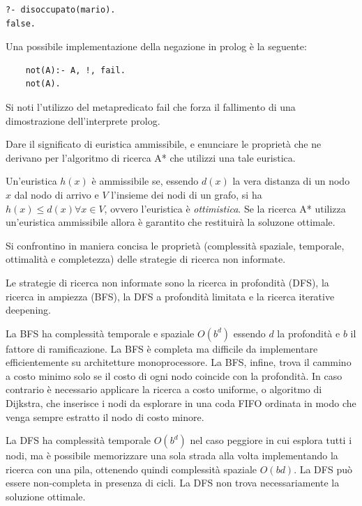 \documentclass[answers, a4paper, 11pt]{exam}
\begin{document}
\begin{questions}
\begin{solution}
\begin{verbatim}
?- disoccupato(mario).
false.

  \end{verbatim}
  Una possibile implementazione della negazione in prolog è la seguente: \newline
  \begin{verbatim}
    not(A):- A, !, fail.
    not(A).
  \end{verbatim}
  Si noti l'utilizzo del metapredicato fail che forza il fallimento di una dimostrazione dell'interprete prolog.
    \end{solution}

\question Dare il significato di euristica ammissibile, e enunciare le proprietà che ne derivano per l’algoritmo
di ricerca A* che utilizzi una tale euristica.
	\begin{solution}
		Un'euristica $h(x)$ è ammissibile se, essendo $d(x)$ la vera distanza di un nodo $x$ dal nodo di arrivo e $V$ l'insieme dei nodi di un grafo, si ha $h(x) \leq d(x) \forall x \in V$, ovvero l'euristica è \emph{ottimistica}. 
		Se la ricerca A* utilizza un'euristica ammissibile allora è garantito che restituirà la soluzone ottimale. 
	\end{solution}
\question Si confrontino in maniera concisa le proprietà (complessità spaziale, temporale, ottimalità e completezza) delle strategie di ricerca non informate.
\begin{solution}
  Le strategie di  ricerca non informate sono la ricerca in profondità (DFS), la ricerca in ampiezza (BFS), la DFS a profondità limitata e la ricerca iterative deepening. 

  La BFS ha complessità temporale e spaziale $O(b^d)$ essendo $d$ la profondità e $b$ il fattore di ramificazione.
  La BFS è completa ma difficile da implementare efficientemente su architetture monoprocessore.
  La BFS, infine, trova il cammino a costo minimo solo se il costo di ogni nodo coincide con la profondità. 
  In caso contrario è necessario applicare la ricerca a costo uniforme, o algoritmo di Dijkstra, che inserisce i nodi da esplorare in una coda FIFO ordinata in modo che venga sempre estratto il nodo di costo minore. 
  
  La DFS ha complessità temporale $O(b^d)$ nel caso peggiore in cui esplora tutti i nodi, ma è possibile memorizzare una sola strada alla volta implementando la ricerca con una pila, ottenendo quindi complessità spaziale $O(bd)$. 
  La DFS può essere non-completa in presenza di cicli. 
  La DFS non trova necessariamente la soluzione ottimale. 


\end{solution}
\end{questions}
\end{document}
